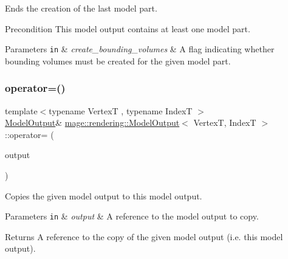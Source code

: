 Ends the creation of the last model part.

\begin{DoxyPrecond}{Precondition}
This model output contains at least one model part. 
\end{DoxyPrecond}

\begin{DoxyParams}[1]{Parameters}
\mbox{\tt in}  & {\em create\+\_\+bounding\+\_\+volumes} & A flag indicating whether bounding volumes must be created for the given model part. \\
\hline
\end{DoxyParams}
\mbox{\label{structmage_1_1rendering_1_1_model_output_a902ae401740dbcc886b85977efe7c0da}} 
\subsubsection{\texorpdfstring{operator=()}{operator=()}\hspace{0.1cm}{\footnotesize\ttfamily [1/2]}}
{\footnotesize\ttfamily template$<$typename VertexT , typename IndexT $>$ \\
\mbox{\hyperlink{structmage_1_1rendering_1_1_model_output}{Model\+Output}}\& \mbox{\hyperlink{structmage_1_1rendering_1_1_model_output}{mage\+::rendering\+::\+Model\+Output}}$<$ VertexT, IndexT $>$\+::operator= (\begin{DoxyParamCaption}\item[{const \mbox{\hyperlink{structmage_1_1rendering_1_1_model_output}{Model\+Output}}$<$ VertexT, IndexT $>$ \&}]{output }\end{DoxyParamCaption})\hspace{0.3cm}{\ttfamily [delete]}}

Copies the given model output to this model output.


\begin{DoxyParams}[1]{Parameters}
\mbox{\tt in}  & {\em output} & A reference to the model output to copy. \\
\hline
\end{DoxyParams}
\begin{DoxyReturn}{Returns}
A reference to the copy of the given model output (i.\+e. this model output). 
\end{DoxyReturn}
\mbox{\label{structmage_1_1rendering_1_1_model_output_a10eb65082a0104be36c51cfc613fd156}} 
